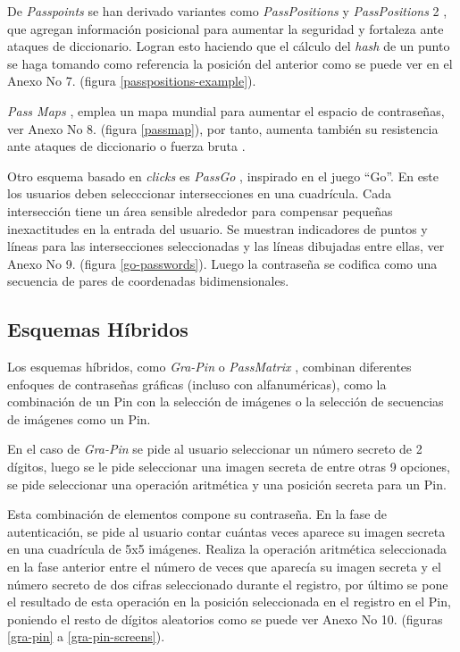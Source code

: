 De \textit{Passpoints} se han derivado variantes como \textit{PassPositions} y \textit{PassPositions} 2 \cite{8320723}, que agregan información posicional para aumentar la seguridad y fortaleza ante ataques de diccionario. Logran esto haciendo que el cálculo del \textit{hash} de un punto se haga tomando como referencia la posición del anterior como se puede ver en el Anexo No 7. (figura \ref{passpositions-example}).




\textit{Pass Maps} \cite{10.1145/2414456.2414513}, emplea un mapa mundial para aumentar el espacio de contraseñas, ver Anexo No 8. (figura \ref{passmap}), por tanto, aumenta también su resistencia ante ataques de diccionario o fuerza bruta \cite{5738831}.



Otro esquema basado en \textit{clicks} es \textit{PassGo} \cite{tao2008pass}, inspirado en el juego ``Go''. En este los usuarios deben selecccionar intersecciones en una cuadrícula. Cada intersección tiene un área sensible alrededor para compensar pequeñas inexactitudes en la entrada del usuario. Se muestran indicadores de puntos y líneas para las intersecciones seleccionadas y las líneas dibujadas entre ellas, ver Anexo No 9. (figura \ref{go-passwords}). Luego la contraseña se codifica como una secuencia de pares de coordenadas bidimensionales.



\subsection{Esquemas Híbridos}
Los esquemas híbridos, como \textit{Gra-Pin} \cite{kausar2022gra} o \textit{PassMatrix} \cite{8250568}, combinan diferentes enfoques de contraseñas gráficas (incluso con alfanuméricas), como la combinación de un Pin con la selección de imágenes o la selección de secuencias de imágenes como un Pin. 

En el caso de \textit{Gra-Pin} \cite{kausar2022gra} se pide al usuario seleccionar un número secreto de 2 dígitos, luego se le pide seleccionar una imagen secreta de entre otras 9 opciones, se pide seleccionar una operación aritmética y una posición secreta para  un Pin. 

Esta combinación de elementos compone su contraseña. En la fase de autenticación, se pide al usuario contar cuántas veces aparece su imagen secreta en una cuadrícula de 5x5 imágenes. Realiza la operación aritmética seleccionada en la fase anterior entre el número de veces que aparecía su imagen secreta y el número secreto de dos cifras seleccionado durante el registro, por último se pone el resultado de esta operación en la posición seleccionada en el registro en el Pin, poniendo el resto de dígitos aleatorios como se puede ver Anexo No 10. (figuras \ref{gra-pin} a \ref{gra-pin-screens}). 

